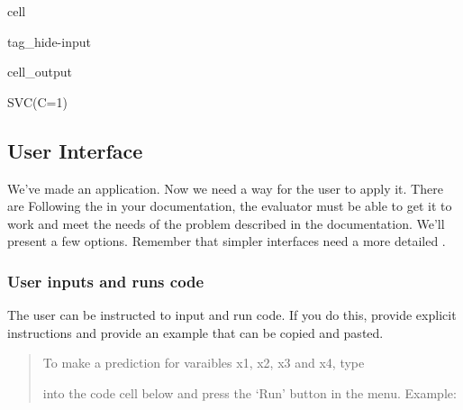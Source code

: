 \documentclass[letterpaper,10pt,english]{jupyterBook}
\begin{document}
\sphinxstepscope

\begin{sphinxuseclass}{cell}
\begin{sphinxuseclass}{tag_hide-input}\begin{sphinxVerbatimOutput}

\begin{sphinxuseclass}{cell_output}
\begin{sphinxVerbatim}[commandchars=\\\{\}]
SVC(C=1)
\end{sphinxVerbatim}

\end{sphinxuseclass}\end{sphinxVerbatimOutput}

\end{sphinxuseclass}
\end{sphinxuseclass}

\subsection{User Interface}
\label{\detokenize{task2_c/example_sup_class/sup_class_ex-ui:user-interface}}\label{\detokenize{task2_c/example_sup_class/sup_class_ex-ui:sup-class-ex-user-interface}}\label{\detokenize{task2_c/example_sup_class/sup_class_ex-ui::doc}}
\sphinxAtStartPar
We’ve made an application. Now we need a way for the user to apply it. There are  Following the  in your documentation, the evaluator must be able to get it to work and meet the needs of the problem described in the documentation. We’ll present a few options. Remember that simpler interfaces need a more detailed .


\subsubsection{User inputs and runs code}
\label{\detokenize{task2_c/example_sup_class/sup_class_ex-ui:user-inputs-and-runs-code}}\label{\detokenize{task2_c/example_sup_class/sup_class_ex-ui:sup-class-ex-ui-code}}
\sphinxAtStartPar
The user can be instructed to input and run code. If you do this, provide explicit instructions and provide an example that can be copied and pasted.
\begin{quote}

\sphinxAtStartPar
To make a prediction for varaibles x1, x2, x3 and x4, type

\sphinxAtStartPar
{}

\sphinxAtStartPar
into the code cell below and press the ‘Run’ button in the menu.
Example:
\end{quote}
\end{document}
